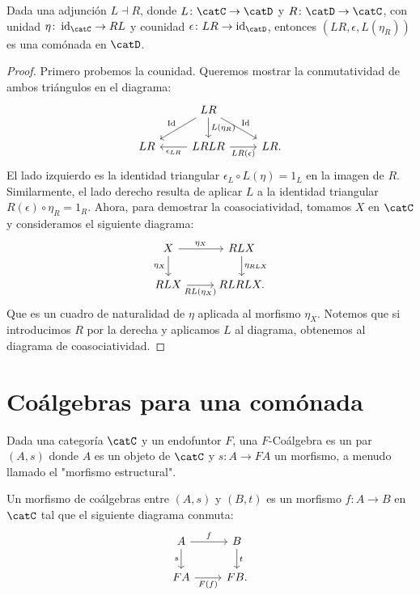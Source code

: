 \begin{proposition}[label=prop:comonadainducida]
  Dada una adjunción $L\dashv R$, donde $L\colon\catC\to\catD$ y $R\colon\catD\to\catC$, con unidad $\eta\colon \id_{\catC}\to RL$ y counidad 
  $\epsilon\colon LR\to \id_{\catD}$, entonces $(LR,\epsilon,L(\eta_R))$ es una comónada en $\catD$.
\end{proposition}
\begin{proof}
  Primero probemos la counidad. Queremos mostrar la conmutatividad de ambos triángulos en el diagrama:
  \begin{equation*}
    \begin{tikzcd}
      {} & LR\ar[swap]{ld}{\Id}\ar{d}{L(\eta_R)}\ar{rd}{\Id} & {} \\
      LR & LRLR\ar{l}{\epsilon_{LR}}\ar[swap]{r}{LR(\epsilon)} & LR.
    \end{tikzcd}
  \end{equation*}
  El lado izquierdo es la identidad triangular $\epsilon_L\circ L(\eta) = 1_L$ en la imagen de $R$.
  Similarmente, el lado derecho resulta de aplicar $L$ a la identidad triangular $R(\epsilon)\circ\eta_R = 1_R$.
  Ahora, para demostrar la coasociatividad, tomamos $X$ en $\catC$ y consideramos el siguiente diagrama:
  \begin{equation*}
    \begin{tikzcd}
      X\ar[swap]{d}{\eta_X}\ar{r}{\eta_X} & RLX\ar{d}{\eta_{RLX}} \\
      RLX\ar[swap]{r}{RL(\eta_X)} & RLRLX.
    \end{tikzcd}
  \end{equation*}
  Que es un cuadro de naturalidad de $\eta$ aplicada al morfismo $\eta_X$. Notemos que si
  introducimos $R$ por la derecha y aplicamos $L$ al diagrama, obtenemos al diagrama de coasociatividad.
\end{proof}

\section{Coálgebras para una comónada}

\begin{definition}
  Dada una categoría $\catC$ y un endofuntor $F$, una $F$-Coálgebra es un par $(A,s)$ donde $A$ es un objeto de $\catC$ y $s\colon A\to FA$ un morfismo, a menudo llamado el "morfismo estructural".
\end{definition}

\begin{definition}
  Un morfismo de coálgebras entre $(A,s)$ y $(B,t)$ es un morfismo $f\colon A\to B$ en $\catC$ tal que el siguiente diagrama conmuta:
  \begin{equation*}
    \begin{tikzcd}
      A\ar[swap]{d}{s}\ar{r}{f} & B\ar{d}{t} \\
      FA\ar[swap]{r}{F(f)} & FB.
    \end{tikzcd}
  \end{equation*}
\end{definition}

